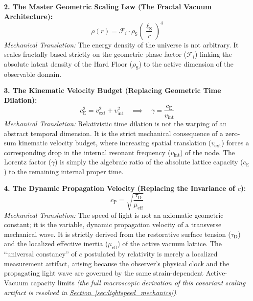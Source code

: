 \vspace{0.5em}
\noindent \textbf{2. The Master Geometric Scaling Law (The Fractal Vacuum Architecture):}
\begin{equation}
    \rho(r) = \mathcal{F}_i \cdot \rho_{\mathrm{S}} \left(\frac{\ell_{\mathrm{S}}}{r}\right)^4
\end{equation}
\textit{Mechanical Translation:} The energy density of the universe is not arbitrary. It scales fractally based strictly on the geometric phase factor ($\mathcal{F}_i$) linking the absolute latent density of the Hard Floor ($\rho_{\mathrm{S}}$) to the active dimension of the observable domain.

\vspace{0.5em}
\noindent \textbf{3. The Kinematic Velocity Budget (Replacing Geometric Time Dilation):}
\begin{equation}
    c_{\mathrm{E}}^2 = v_{\mathrm{ext}}^2 + v_{\mathrm{int}}^2 \quad \implies \quad \gamma = \frac{c_{\mathrm{E}}}{v_{\mathrm{int}}}
\end{equation}
\textit{Mechanical Translation:} Relativistic time dilation is not the warping of an abstract temporal dimension. It is the strict mechanical consequence of a zero-sum kinematic velocity budget, where increasing spatial translation ($v_{\mathrm{ext}}$) forces a corresponding drop in the internal resonant frequency ($v_{\mathrm{int}}$) of the node. The Lorentz factor ($\gamma$) is simply the algebraic ratio of the absolute lattice capacity ($c_{\mathrm{E}}$) to the remaining internal proper time.

\vspace{0.5em}
\noindent \textbf{4. The Dynamic Propagation Velocity (Replacing the Invariance of $c$):}
\begin{equation}
    c_{\mathrm{P}} = \sqrt{\frac{\tau_{\mathrm{D}}}{\mu_{\mathrm{eff}}}} 
\end{equation}
\textit{Mechanical Translation:} The speed of light is not an axiomatic geometric constant; it is the variable, dynamic propagation velocity of a transverse mechanical wave. It is strictly derived from the restorative surface tension ($\tau_{\mathrm{D}}$) and the localized effective inertia ($\mu_{\mathrm{eff}}$) of the active vacuum lattice. The ``universal constancy'' of $c$ postulated by relativity is merely a localized measurement artifact, arising because the observer's physical clock and the propagating light wave are governed by the same strain-dependent Active-Vacuum capacity limits \textit{(the full macroscopic derivation of this covariant scaling artifact is resolved in \hyperref[sec:lightspeed_mechanics]{Section~\ref*{sec:lightspeed_mechanics}})}.

